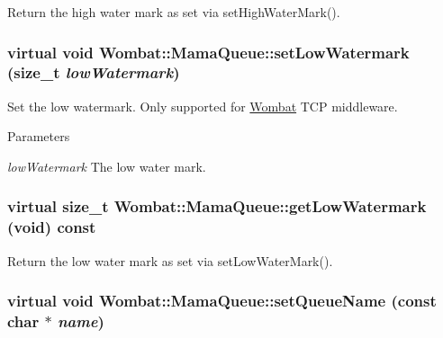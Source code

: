 Return the high water mark as set via {\ttfamily setHighWaterMark()}. \hypertarget{classWombat_1_1MamaQueue_a186d02095e3e6b65abe0b34603d3ab30}{
\subsubsection[{setLowWatermark}]{\setlength{\rightskip}{0pt plus 5cm}virtual void Wombat::MamaQueue::setLowWatermark (size\_\-t {\em lowWatermark})}}
\label{classWombat_1_1MamaQueue_a186d02095e3e6b65abe0b34603d3ab30}


Set the low watermark. Only supported for \hyperlink{namespaceWombat}{Wombat} TCP middleware. 
\begin{DoxyParams}{Parameters}
\item[{\em lowWatermark}]The low water mark. \end{DoxyParams}
\hypertarget{classWombat_1_1MamaQueue_abbdc2a846667fd60ee520c141ff0e1c0}{
\subsubsection[{getLowWatermark}]{\setlength{\rightskip}{0pt plus 5cm}virtual size\_\-t Wombat::MamaQueue::getLowWatermark (void) const}}
\label{classWombat_1_1MamaQueue_abbdc2a846667fd60ee520c141ff0e1c0}


Return the low water mark as set via {\ttfamily setLowWaterMark()}. \hypertarget{classWombat_1_1MamaQueue_ab44bf7f7f43693737d58f0155dbf7cc3}{
\subsubsection[{setQueueName}]{\setlength{\rightskip}{0pt plus 5cm}virtual void Wombat::MamaQueue::setQueueName (const char $\ast$ {\em name})}}
\label{classWombat_1_1MamaQueue_ab44bf7f7f43693737d58f0155dbf7cc3}


